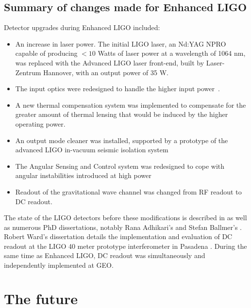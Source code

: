 \subsection{Summary of changes made for Enhanced LIGO}


Detector upgrades during Enhanced LIGO included:
\begin{itemize}
\item An increase in laser power.  The initial LIGO laser, an Nd:YAG
  NPRO capable of producing $< 10$ Watts of laser power at a
  wavelength of 1064 nm, was replaced with the Advanced LIGO laser
  front-end, built by Laser-Zentrum Hannover\cite{Frede2007Fundamental}, with an output power of 35 W.
\item The input optics were redesigned to handle the higher input
  power~\cite{DooleyCharacterization,Quetschke2008ElectroOptic}.  
\item A new thermal compensation system was implemented to compensate
  for the greater amount of thermal lensing that would be induced by
  the higher operating power\cite{Ballmer2006LIGO,RupalThesis}.
\item An output mode cleaner was installed, supported by a prototype
  of the advanced LIGO in-vacuum seismic isolation system~\cite{KisselThesis}
\item The Angular Sensing and Control system was redesigned to cope
  with angular instabilities introduced at high
  power~\cite{Sidles2006Optical,DooleyAngular}
\item Readout of the gravitational wave channel was changed from RF
  readout to DC readout.
\end{itemize}

The state of the LIGO detectors before these modifications is
described in \cite{S5InstrumentPaper} as well as numerous PhD
dissertations, notably Rana Adhikari's \cite{RanaThesis} and
Stefan Ballmer's \cite{Ballmer2006LIGO}.  Robert Ward's dissertation
details the implementation and evaluation of DC readout at the LIGO 40
meter prototype interferometer in Pasadena \cite{RobWardThesis}.
%
During the same time as Enhanced LIGO, DC readout was simultaneously
and independently implemented at GEO\cite{GeoDC,Degallaix2010Commissioning}.

\section{The future}

